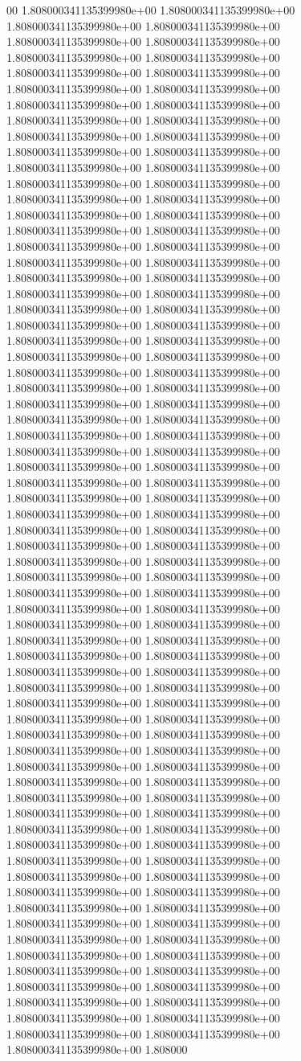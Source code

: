 00	1.808000341135399980e+00	1.808000341135399980e+00	1.808000341135399980e+00	1.808000341135399980e+00	1.808000341135399980e+00	1.808000341135399980e+00	1.808000341135399980e+00	1.808000341135399980e+00	1.808000341135399980e+00	1.808000341135399980e+00	1.808000341135399980e+00	1.808000341135399980e+00	1.808000341135399980e+00	1.808000341135399980e+00	1.808000341135399980e+00	1.808000341135399980e+00	1.808000341135399980e+00	1.808000341135399980e+00	1.808000341135399980e+00	1.808000341135399980e+00	1.808000341135399980e+00	1.808000341135399980e+00	1.808000341135399980e+00	1.808000341135399980e+00	1.808000341135399980e+00	1.808000341135399980e+00	1.808000341135399980e+00	1.808000341135399980e+00	1.808000341135399980e+00	1.808000341135399980e+00	1.808000341135399980e+00	1.808000341135399980e+00	1.808000341135399980e+00	1.808000341135399980e+00	1.808000341135399980e+00	1.808000341135399980e+00	1.808000341135399980e+00	1.808000341135399980e+00	1.808000341135399980e+00	1.808000341135399980e+00	1.808000341135399980e+00	1.808000341135399980e+00	1.808000341135399980e+00	1.808000341135399980e+00	1.808000341135399980e+00	1.808000341135399980e+00	1.808000341135399980e+00	1.808000341135399980e+00	1.808000341135399980e+00	1.808000341135399980e+00	1.808000341135399980e+00	1.808000341135399980e+00	1.808000341135399980e+00	1.808000341135399980e+00	1.808000341135399980e+00	1.808000341135399980e+00	1.808000341135399980e+00	1.808000341135399980e+00	1.808000341135399980e+00	1.808000341135399980e+00	1.808000341135399980e+00	1.808000341135399980e+00	1.808000341135399980e+00	1.808000341135399980e+00	1.808000341135399980e+00	1.808000341135399980e+00	1.808000341135399980e+00	1.808000341135399980e+00	1.808000341135399980e+00	1.808000341135399980e+00	1.808000341135399980e+00	1.808000341135399980e+00	1.808000341135399980e+00	1.808000341135399980e+00	1.808000341135399980e+00	1.808000341135399980e+00	1.808000341135399980e+00	1.808000341135399980e+00	1.808000341135399980e+00	1.808000341135399980e+00	1.808000341135399980e+00	1.808000341135399980e+00	1.808000341135399980e+00	1.808000341135399980e+00	1.808000341135399980e+00	1.808000341135399980e+00	1.808000341135399980e+00	1.808000341135399980e+00	1.808000341135399980e+00	1.808000341135399980e+00	1.808000341135399980e+00	1.808000341135399980e+00	1.808000341135399980e+00	1.808000341135399980e+00	1.808000341135399980e+00	1.808000341135399980e+00	1.808000341135399980e+00	1.808000341135399980e+00	1.808000341135399980e+00	1.808000341135399980e+00	1.808000341135399980e+00	1.808000341135399980e+00	1.808000341135399980e+00	1.808000341135399980e+00	1.808000341135399980e+00	1.808000341135399980e+00	1.808000341135399980e+00	1.808000341135399980e+00	1.808000341135399980e+00	1.808000341135399980e+00	1.808000341135399980e+00	1.808000341135399980e+00	1.808000341135399980e+00	1.808000341135399980e+00	1.808000341135399980e+00	1.808000341135399980e+00	1.808000341135399980e+00	1.808000341135399980e+00	1.808000341135399980e+00	1.808000341135399980e+00	1.808000341135399980e+00	1.808000341135399980e+00	1.808000341135399980e+00	1.808000341135399980e+00	1.808000341135399980e+00	1.808000341135399980e+00	1.808000341135399980e+00	1.808000341135399980e+00	1.808000341135399980e+00	1.808000341135399980e+00	1.808000341135399980e+00	1.808000341135399980e+00	1.808000341135399980e+00	1.808000